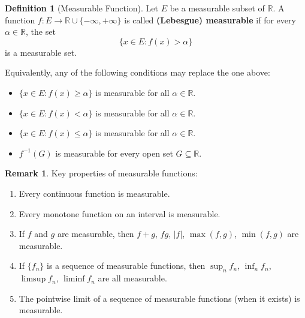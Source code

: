 \documentclass[12pt,a4paper]{article}
\theoremstyle{definition}
\newtheorem{definition}{Definition}[section]
\newtheorem{remark}[theorem]{Remark}
\newcommand{\R}{\mathbb{R}}
\begin{document}
\begin{definition}[Measurable Function]
Let $E$ be a measurable subset of $\R$. A function $f: E \to \R \cup \{-\infty, +\infty\}$ is called \textbf{(Lebesgue) measurable} if for every $\alpha \in \R$, the set
\[
    \{x \in E : f(x) > \alpha\}
\]
is a measurable set.

Equivalently, any of the following conditions may replace the one above:
\begin{itemize}
    \item $\{x \in E : f(x) \geq \alpha\}$ is measurable for all $\alpha \in \R$.
    \item $\{x \in E : f(x) < \alpha\}$ is measurable for all $\alpha \in \R$.
    \item $\{x \in E : f(x) \leq \alpha\}$ is measurable for all $\alpha \in \R$.
    \item $f^{-1}(G)$ is measurable for every open set $G \subseteq \R$.
\end{itemize}
\end{definition}

\begin{remark}
Key properties of measurable functions:
\begin{enumerate}[label=(\roman*)]
    \item Every continuous function is measurable.
    \item Every monotone function on an interval is measurable.
    \item If $f$ and $g$ are measurable, then $f + g$, $fg$, $|f|$, $\max(f,g)$, $\min(f,g)$ are measurable.
    \item If $\{f_n\}$ is a sequence of measurable functions, then $\sup_n f_n$, $\inf_n f_n$, $\limsup f_n$, $\liminf f_n$ are all measurable.
    \item The pointwise limit of a sequence of measurable functions (when it exists) is measurable.
\end{enumerate}
\end{remark}
\end{document}

